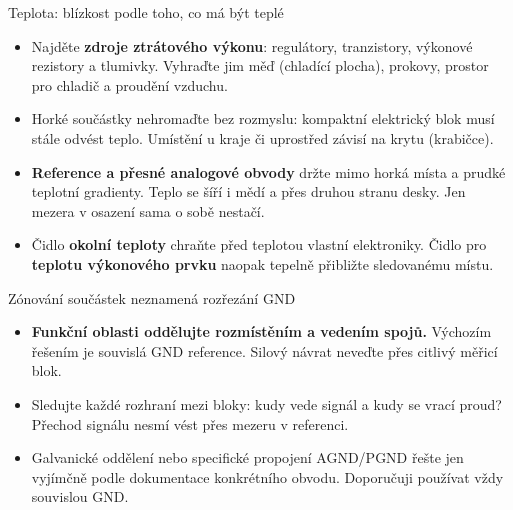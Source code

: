 \documentclass{beamer}
\begin{document}
\begin{frame}[t]{Teplota: blízkost podle toho, co má být teplé}
	\small
	\begin{itemize}
		\item Najděte \textbf{zdroje ztrátového výkonu}: regulátory, tranzistory, výkonové rezistory a tlumivky. Vyhraďte jim měď (chladící plocha), prokovy, prostor pro chladič a proudění vzduchu.
		\item Horké součástky nehromaďte bez rozmyslu: kompaktní elektrický blok musí stále odvést teplo. Umístění u kraje či uprostřed závisí na krytu (krabičce).
		\item \textbf{Reference a přesné analogové obvody} držte mimo horká místa a prudké teplotní gradienty. Teplo se šíří i mědí a přes druhou stranu desky. Jen mezera v osazení sama o sobě nestačí.
		\item Čidlo \textbf{okolní teploty} chraňte před teplotou vlastní elektroniky. Čidlo pro \textbf{teplotu výkonového prvku} naopak tepelně přibližte sledovanému místu.
	\end{itemize}
\end{frame}

\begin{frame}[t]{Zónování součástek neznamená rozřezání GND}
	\small
	\begin{itemize}
		\item \textbf{Funkční oblasti oddělujte rozmístěním a vedením spojů.} Výchozím řešením je souvislá GND reference. Silový návrat neveďte přes citlivý měřicí blok.
		\item Sledujte každé rozhraní mezi bloky: kudy vede signál a kudy se vrací proud? Přechod signálu nesmí vést přes mezeru v referenci.
		\item Galvanické oddělení nebo specifické propojení AGND/PGND řešte jen vyjímčně podle dokumentace konkrétního obvodu. Doporučuji používat vždy souvislou GND.
	\end{itemize}
\end{frame}

\end{document}
